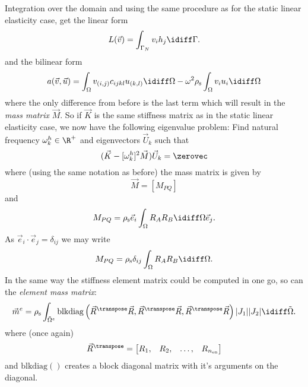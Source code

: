 Integration over the domain and using the same procedure as for the static linear elasticity case, get the linear form
\begin{equation*}
	L(\vec{v}) = \int_{\Gamma_N} v_i h_j\idiff\Gamma.
\end{equation*}
and the bilinear form
\begin{equation*}
	a(\vec{v},\vec{u}) = \int_\Omega v_{(i,j)}c_{ijkl}u_{(k,l)}\idiff\Omega - \omega^2\rho_{\mathrm{s}} \int_\Omega v_i u_i\idiff\Omega
\end{equation*}
where the only difference from before is the last term which will result in the \textit{mass matrix} $\vec{M}$. So if $\vec{K}$ is the same stiffness matrix as in the static linear elasticity case, we now have the following eigenvalue problem: Find natural frequency $\omega_k^h\in\R^+$ and eigenvectors $\vec{U}_k$ such that
\begin{equation*}
	(\vec{K}-[\omega_k^h]^2\vec{M})\vec{U}_k=\zerovec
\end{equation*}
where (using the same notation as before) the mass matrix is given by
\begin{equation*}
	\vec{M} = \left[M_{PQ}\right]
\end{equation*}
and
\begin{equation*}
	M_{PQ} = \rho_{\mathrm{s}} \vec{e}_i\int_\Omega R_A R_B\idiff\Omega\vec{e}_j.
\end{equation*}
As $\vec{e}_i\cdot \vec{e}_j = \delta_{ij}$ we may write
\begin{equation*}
	M_{PQ} = \rho_{\mathrm{s}} \delta_{ij}\int_\Omega R_A R_B\idiff\Omega.
\end{equation*}
In the same way the stiffness element matrix could be computed in one go, so can the \textit{element mass matrix}:
\begin{equation*}
	\vec{m}^e = \rho_{\mathrm{s}} \int_{\tilde{\Omega}^e}\mathrm{blkdiag}\left(\vec{R}^\transpose\vec{R},\vec{R}^\transpose\vec{R},\vec{R}^\transpose\vec{R}\right)|J_1||J_2| \idiff\tilde{\Omega}.
\end{equation*}
where (once again)
\begin{equation*}
	\vec{R}^\transpose = \begin{bmatrix}
		R_1, & R_2, & \dots, & R_{n_{\mathrm{en}}}
	\end{bmatrix}
\end{equation*}
and $\mathrm{blkdiag}()$ creates a block diagonal matrix with it's arguments on the diagonal.


